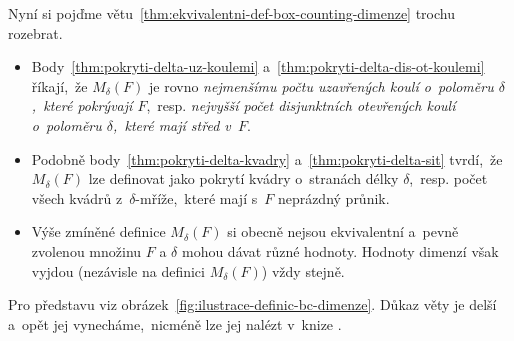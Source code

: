 Nyní si pojďme větu~\ref{thm:ekvivalentni-def-box-counting-dimenze} trochu rozebrat.
\begin{itemize}
    \item Body~\ref{thm:pokryti-delta-uz-koulemi} a~\ref{thm:pokryti-delta-dis-ot-koulemi} říkají,~že $M_\delta(F)$ je rovno \emph{nejmenšímu počtu uzavřených koulí o~poloměru $\delta$,~které pokrývají $F$},~resp. \emph{nejvyšší počet disjunktních otevřených koulí o~poloměru $\delta$,~které mají střed v~$F$}.
    \item Podobně body~\ref{thm:pokryti-delta-kvadry} a~\ref{thm:pokryti-delta-sit} tvrdí,~že $M_\delta(F)$ lze definovat jako pokrytí kvádry o~stranách délky $\delta$,~resp. počet všech kvádrů z~$\delta$-mříže,~které mají s~$F$ neprázdný průnik.
    \item Výše zmíněné definice $M_\delta(F)$ si obecně nejsou ekvivalentní a~pevně zvolenou množinu $F$ a $\delta$ mohou dávat různé hodnoty. Hodnoty dimenzí však vyjdou (nezávisle na definici $M_\delta(F)$) vždy stejně.
\end{itemize}
Pro představu viz obrázek~\ref{fig:ilustrace-definic-bc-dimenze}. Důkaz věty je delší a~opět jej vynecháme,~nicméně lze jej nalézt v~knize \citep[str. 30]{Falconer2014}.
